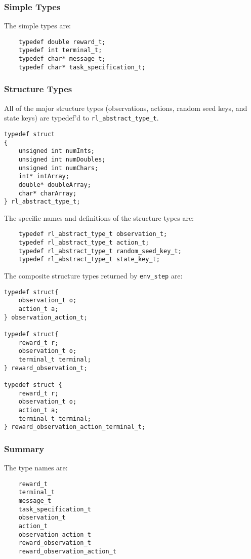 \documentclass[11pt]{article}
\begin{document}
\subsubsection{Simple Types}
The simple types are:

\begin{verbatim}
    typedef double reward_t;
    typedef int terminal_t;
    typedef char* message_t;
    typedef char* task_specification_t;
\end{verbatim}

\def\rat{rl\_abstract\_type\_t}

\subsubsection{Structure Types}
\label{sec:structure-types}
All of the major structure types (observations, actions, random seed keys, and state keys) are typedef'd to \texttt{\rat}.

\begin{verbatim}
typedef struct
{
    unsigned int numInts;
    unsigned int numDoubles;
    unsigned int numChars;
    int* intArray;
    double* doubleArray;
    char* charArray;
} rl_abstract_type_t;
\end{verbatim}

The specific names and definitions of the structure types are:
\begin{verbatim}
    typedef rl_abstract_type_t observation_t;
    typedef rl_abstract_type_t action_t;
    typedef rl_abstract_type_t random_seed_key_t;
    typedef rl_abstract_type_t state_key_t;
\end{verbatim}

The composite structure types returned by \texttt{env\_step} are:
\begin{verbatim}
typedef struct{
    observation_t o;
    action_t a;
} observation_action_t;

typedef struct{
    reward_t r;
    observation_t o;
    terminal_t terminal;
} reward_observation_t;

typedef struct {
    reward_t r;
    observation_t o;
    action_t a;
    terminal_t terminal;
} reward_observation_action_terminal_t;
\end{verbatim}

\subsubsection{Summary}
The type names are:
\begin{verbatim}
    reward_t
    terminal_t
    message_t
    task_specification_t
    observation_t
    action_t
    observation_action_t
    reward_observation_t
    reward_observation_action_t
\end{verbatim}
\end{document}
